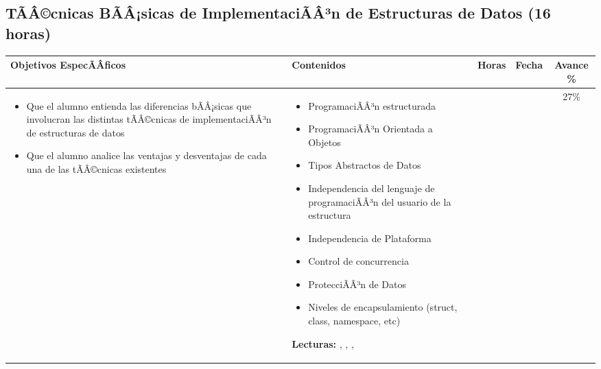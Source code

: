 \documentclass[a4paper]{article}
\newenvironment{unitgoals}
{ \begin{itemize} }
{ \end{itemize}   }
\newenvironment{topics}
{ \begin{itemize} }
{ \end{itemize}   }
\begin{document}
\subsection{TÃÂ©cnicas BÃÂ¡sicas de ImplementaciÃÂ³n de Estructuras de Datos (16 horas)}
\begin{tabularx}{\textwidth}{|X|X|c|c|c|}
\hline
\textbf{Objetivos EspecÃÂ­ficos} &   \textbf{Contenidos} & \textbf{Horas} & \textbf{Fecha} & \textbf{Avance \%}  \\ \hline
\begin{unitgoals}
         \item Que el alumno entienda las diferencias bÃÂ¡sicas que involucran las distintas tÃÂ©cnicas de implementaciÃÂ³n de estructuras de datos
         \item Que el alumno analice las ventajas y desventajas de cada una de las tÃÂ©cnicas existentes
   \end{unitgoals}      &
\begin{topics}
         \item ProgramaciÃÂ³n estructurada
         \item ProgramaciÃÂ³n Orientada a Objetos
         \item Tipos Abstractos de Datos
         \item Independencia del lenguaje de programaciÃÂ³n del usuario de la estructura
         \item Independencia de Plataforma
         \item Control de concurrencia
         \item ProtecciÃÂ³n de Datos
         \item Niveles de encapsulamiento (struct, class, namespace, etc)
   \end{topics}
{\bf Lecturas:} \cite{Cuadros2004Implementing}, \cite{Knuth2007TAOCP-V-I}, \cite{Knuth2007TAOCP-V-II}, \cite{Gamma94} &
&
&
27\%
\\
\hline
\end{tabularx}

\end{document}
